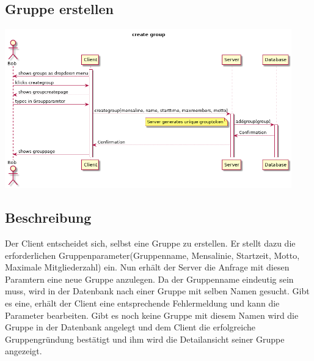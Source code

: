 \documentclass[a4paper]{scrreprt}
\begin{document}
\subsection{Gruppe erstellen}
\begin{center}
\includegraphics[width=0.93\textwidth]{Sequenzdiagramme/CreateGroup.png}

\end{center}
\subsection*{Beschreibung}
Der Client entscheidet sich, selbst eine Gruppe zu erstellen. Er stellt dazu die erforderlichen Gruppenparameter(Gruppenname, Mensalinie, Startzeit, Motto, Maximale Mitgliederzahl) ein. Nun erhält der Server die Anfrage mit diesen Paramtern eine neue Gruppe anzulegen. Da der Gruppenname eindeutig sein muss, wird in der Datenbank nach einer Gruppe mit selben Namen gesucht. Gibt es eine, erhält der Client eine entsprechende Fehlermeldung und kann die Parameter bearbeiten. Gibt es noch keine Gruppe mit diesem Namen wird die Gruppe in der Datenbank angelegt und dem Client die erfolgreiche Gruppengründung bestätigt und ihm wird die Detailansicht seiner Gruppe angezeigt.

\newpage
\end{document}
